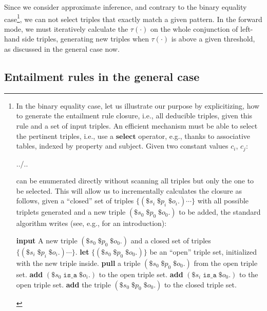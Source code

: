 \documentclass[sn-mathphys]{sn-jnl}
\begin{document}
Since we consider approximate inference, and contrary to the binary equality case\footnote{\label{closure} In the binary equality case, let us illustrate our purpose by explicitizing, how to generate the entailment rule closure, i.e., all deducible triples, given this rule and a set of input triples. An efficient mechanism must be able to select the pertinent triples, i.e., use a $\textbf{select}$ operator, e.g., thanks to associative tables, indexed by property and subject. Given two constant values $c_i$, $c_j$:
\begin{algorithmic}
\State ../..
\EndFor
\end{algorithmic}
can be enumerated directly without scanning all triples but only the one to be selected. This will allow us to incrementally calculates the closure as follows, given a ``closed'' set of triples $\{(\$s_i \; \$p_i \; \$o_i .) \cdots \}$ with all possible triplets generated and a new triple $(\$s_0 \; \$p_0 \; \$o_0 .)$ to be added, the standard algorithm writes (see, e.g.,\cite{kapoor_comparative_2016} for an introduction):
\begin{algorithmic}
\State \textbf{input} A new triple $(\$s_0 \; \$p_0 \; \$o_0 .)$ and a closed set of triples $\{(\$s_i \; \$p_i \; \$o_i .) \cdots \}$.
\State \textbf{let} $\{(\$s_0 \; \$p_0 \; \$o_0 .)\}$ be an ``open'' triple set, initialized with the new triple inside.
\Repeat
\State \textbf{pull} a triple $(\$s_0 \; \$p_0 \; \$o_0 .)$ from the open triple set.
\State \textbf{add} $(\$s_0 \; \texttt{is\_a} \; \$o_i .)$ to the open triple set.
\EndFor
{}
\State \textbf{add} $(\$s_i \; \texttt{is\_a} \; \$o_0 .)$ to the open triple set.
\EndFor
\EndIf
\State \textbf{add} the triple $(\$s_0 \; \$p_0 \; \$o_0 .)$ to the closed triple set.
\end{algorithmic}}, we can not select triples that exactly match a given pattern. In the forward mode, we must iteratively calculate the $\tau(\cdot)$ on the whole conjunction of left-hand side triples, generating new triples when $\tau(\cdot)$ is above a given threshold, as discussed in the general case now.

\subsection{Entailment rules in the general case}
\end{document}
